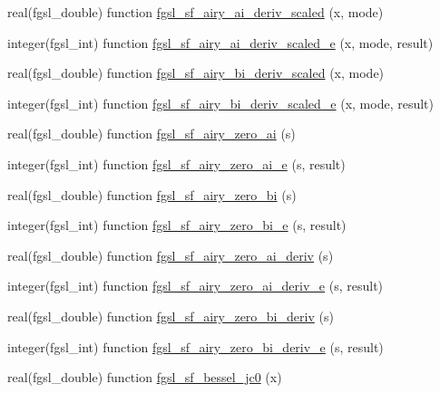 \begin{DoxyCompactItemize}
\item 
real(fgsl\-\_\-double) function \hyperlink{specfunc_8finc_a62e20904bc1014cdb00b144a19d71a1b}{fgsl\-\_\-sf\-\_\-airy\-\_\-ai\-\_\-deriv\-\_\-scaled} (x, mode)
\item 
integer(fgsl\-\_\-int) function \hyperlink{specfunc_8finc_ac8ac3ea3c8e3eede9394a02664127672}{fgsl\-\_\-sf\-\_\-airy\-\_\-ai\-\_\-deriv\-\_\-scaled\-\_\-e} (x, mode, result)
\item 
real(fgsl\-\_\-double) function \hyperlink{specfunc_8finc_a04ba87efb77bcd09477afa381cc42b83}{fgsl\-\_\-sf\-\_\-airy\-\_\-bi\-\_\-deriv\-\_\-scaled} (x, mode)
\item 
integer(fgsl\-\_\-int) function \hyperlink{specfunc_8finc_a79163f45acbbd01d6a77d2dd3deba867}{fgsl\-\_\-sf\-\_\-airy\-\_\-bi\-\_\-deriv\-\_\-scaled\-\_\-e} (x, mode, result)
\item 
real(fgsl\-\_\-double) function \hyperlink{specfunc_8finc_a923a93771a5ee0e06805113016146e9d}{fgsl\-\_\-sf\-\_\-airy\-\_\-zero\-\_\-ai} (s)
\item 
integer(fgsl\-\_\-int) function \hyperlink{specfunc_8finc_a5233f5c6cac412fb4a24145a1d800dbe}{fgsl\-\_\-sf\-\_\-airy\-\_\-zero\-\_\-ai\-\_\-e} (s, result)
\item 
real(fgsl\-\_\-double) function \hyperlink{specfunc_8finc_ade6dd69303b96c3b449ae37c7c9e776d}{fgsl\-\_\-sf\-\_\-airy\-\_\-zero\-\_\-bi} (s)
\item 
integer(fgsl\-\_\-int) function \hyperlink{specfunc_8finc_a7a902baef34b378f8e8a36093b0f8354}{fgsl\-\_\-sf\-\_\-airy\-\_\-zero\-\_\-bi\-\_\-e} (s, result)
\item 
real(fgsl\-\_\-double) function \hyperlink{specfunc_8finc_afe7e2c7cdad1edb4b04d1375f353c0b1}{fgsl\-\_\-sf\-\_\-airy\-\_\-zero\-\_\-ai\-\_\-deriv} (s)
\item 
integer(fgsl\-\_\-int) function \hyperlink{specfunc_8finc_a4ef02912c6ef5409f4de9651d8471f50}{fgsl\-\_\-sf\-\_\-airy\-\_\-zero\-\_\-ai\-\_\-deriv\-\_\-e} (s, result)
\item 
real(fgsl\-\_\-double) function \hyperlink{specfunc_8finc_ada3f1532d9db39bcd789d2dd8a558b19}{fgsl\-\_\-sf\-\_\-airy\-\_\-zero\-\_\-bi\-\_\-deriv} (s)
\item 
integer(fgsl\-\_\-int) function \hyperlink{specfunc_8finc_a3daa8cdb6f16d461ad5c14f31894b4a9}{fgsl\-\_\-sf\-\_\-airy\-\_\-zero\-\_\-bi\-\_\-deriv\-\_\-e} (s, result)
\item 
real(fgsl\-\_\-double) function \hyperlink{specfunc_8finc_ade323a111e69823d5dc00ff166702be1}{fgsl\-\_\-sf\-\_\-bessel\-\_\-jc0} (x)

\end{DoxyCompactItemize}
